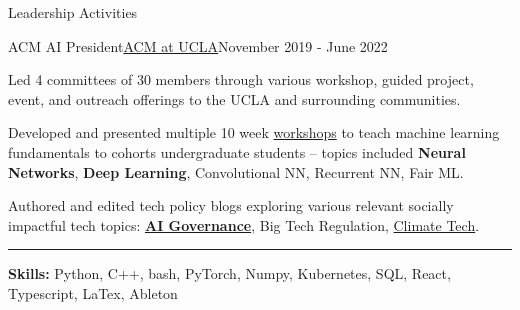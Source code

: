 \documentclass{resume}
\begin{document}
\begin{rSection}{Leadership Activities}
    \begin{rSubsection}{ACM AI President}{\href{https://www.uclaacm.com/}{ACM at UCLA}}{November 2019 - June 2022}
        \item Led 4 committees of 30 members through various workshop, guided project, event, and outreach offerings to the UCLA and surrounding communities.
        \item Developed and presented multiple 10 week \href{https://www.youtube.com/playlist?list=PLPO7_kXilXFYGa-3ZpOXa7Z01ZYAtUh1U}{workshops}
        to teach machine learning fundamentals to cohorts undergraduate students – topics included \textbf{Neural Networks}, \textbf{Deep Learning}, Convolutional NN, Recurrent NN, Fair ML.
        \item Authored and edited tech policy blogs exploring various relevant socially impactful tech topics: \href{https://medium.com/impact-labs/considerations-for-the-future-of-ai-governance-46d727012c5b}{\bf AI Governance}, Big Tech Regulation, \href{https://medium.com/acm-at-ucla/digital-tech-for-a-greener-future-7bc7f2e00bda}{Climate Tech}.
    \end{rSubsection}
\end{rSection}
\hrule
{\bf Skills:} Python, C++, bash, PyTorch, Numpy, Kubernetes, SQL, React, Typescript, LaTex, Ableton
\end{document}
